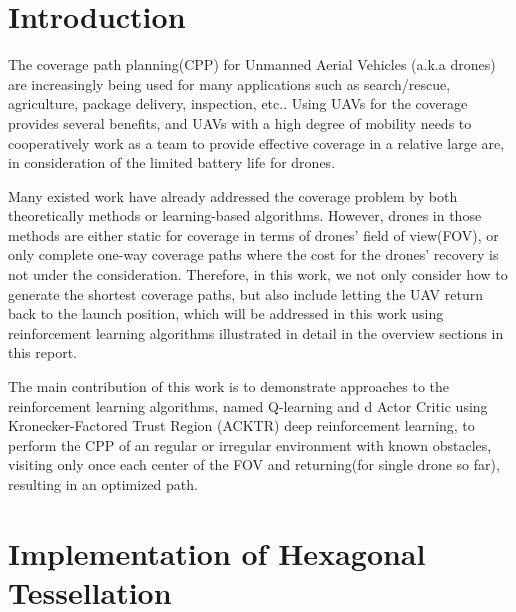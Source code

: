 \documentclass{article}
\begin{document}
\section{Introduction}

\hspace{\parindent} The coverage path planning(CPP) for Unmanned Aerial Vehicles (a.k.a drones) are increasingly being used for many applications such as search/rescue, agriculture, package delivery, inspection, etc.\cite{1}\cite{2}\cite{3}. Using UAVs for the coverage provides several benefits, and UAVs with a high degree of mobility needs to cooperatively work as a team to provide effective coverage in a relative large are, in consideration of the limited battery life for drones\cite{4}.

Many existed work have already addressed the coverage problem by both theoretically methods or learning-based algorithms\cite{5}\cite{esra}\cite{6}. However, drones in those methods are either static for coverage in terms of drones' field of view(FOV), or only complete one-way coverage paths where the cost for the drones' recovery is not under the consideration. Therefore, in this work, we not only consider how to generate the shortest coverage paths, but also include letting the UAV return back to the launch position, which will be addressed in this work using reinforcement learning algorithms illustrated in detail in the overview sections in this report.

The main contribution of this work is to demonstrate approaches to the reinforcement learning algorithms, named Q-learning and d Actor Critic using Kronecker-Factored Trust Region (ACKTR) deep reinforcement learning, to perform the CPP of an regular or irregular environment with known obstacles, visiting only once each center of the FOV and returning(for single drone so far),  resulting in an optimized path.



\section{Implementation of Hexagonal Tessellation}
\end{document}
